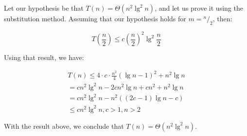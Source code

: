 \documentclass[8pt,a4paper]{article}
\newcommand*\rfrac[2]{{}^{#1}\!/_{#2}}
\begin{document}
  Let our hypothesis be that $T(n) = \Theta(n^{2}\lg^{2} n)$, and let us prove it using
the substitution method. Assuming that our hypothesis holds for $m = \rfrac{n}{2}$, then:

\begin{equation*}
  T\left(\frac{n}{2}\right) \leq c\left(\frac{n}{2}\right)^{2} \lg^{2} \frac{n}{2}
\end{equation*}

  Using that result, we have:

\begin{equation*}
  \begin{split}
    T(n) \leq 4 \cdot c \cdot \frac{n^{2}}{4}(\lg n - 1)^{2} + n^{2}\lg n \\
    = cn^{2}\lg^{2} n - 2cn^{2}\lg n + cn^{2} + n^{2}\lg n \\
    = cn^{2}\lg^{2} n -n^{2}((2c - 1)\lg n - c) \\
    \leq cn^{2}\lg^{2} n, c > 1, n > 2
  \end{split}
\end{equation*}

  With the result above, we conclude that $T(n) = \Theta(n^{2}\lg^{2} n)$.
\end{document}
